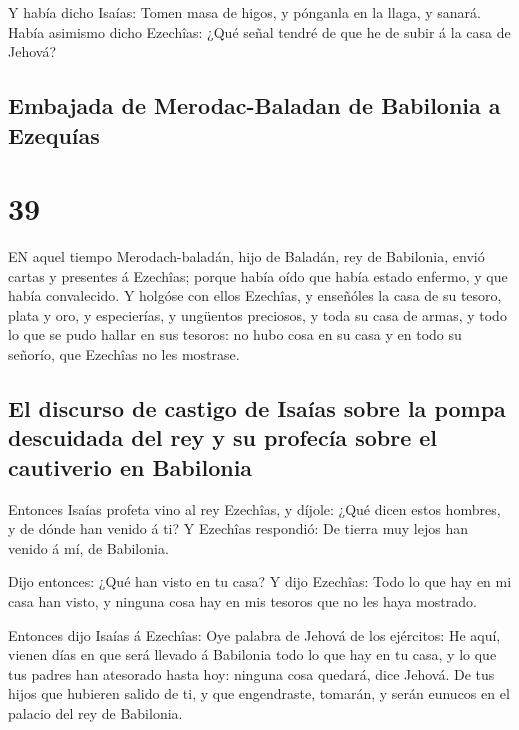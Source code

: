  Y había dicho Isaías: Tomen masa de higos, y pónganla en
la llaga, y sanará.  Había asimismo dicho Ezechîas: ¿Qué
señal tendré de que he de subir á la casa de Jehová?

\hypertarget{embajada-de-merodac-baladan-de-babilonia-a-ezequuxedas}{%
\subsection{Embajada de Merodac-Baladan de Babilonia a
Ezequías}\label{embajada-de-merodac-baladan-de-babilonia-a-ezequuxedas}}

\hypertarget{section-38}{%
\section{39}\label{section-38}}

 EN aquel tiempo Merodach-baladán, hijo de Baladán, rey de
Babilonia, envió cartas y presentes á Ezechîas; porque había oído que
había estado enfermo, y que había convalecido.  Y holgóse
con ellos Ezechîas, y enseñóles la casa de su tesoro, plata y oro, y
especierías, y ungüentos preciosos, y toda su casa de armas, y todo lo
que se pudo hallar en sus tesoros: no hubo cosa en su casa y en todo su
señorío, que Ezechîas no les mostrase.

\hypertarget{el-discurso-de-castigo-de-isauxedas-sobre-la-pompa-descuidada-del-rey-y-su-profecuxeda-sobre-el-cautiverio-en-babilonia}{%
\subsection{El discurso de castigo de Isaías sobre la pompa descuidada
del rey y su profecía sobre el cautiverio en
Babilonia}\label{el-discurso-de-castigo-de-isauxedas-sobre-la-pompa-descuidada-del-rey-y-su-profecuxeda-sobre-el-cautiverio-en-babilonia}}

 Entonces Isaías profeta vino al rey Ezechîas, y díjole:
¿Qué dicen estos hombres, y de dónde han venido á ti? Y Ezechîas
respondió: De tierra muy lejos han venido á mí, de Babilonia.

 Dijo entonces: ¿Qué han visto en tu casa? Y dijo Ezechîas:
Todo lo que hay en mi casa han visto, y ninguna cosa hay en mis tesoros
que no les haya mostrado.

 Entonces dijo Isaías á Ezechîas: Oye palabra de Jehová de
los ejércitos:  He aquí, vienen días en que será llevado á
Babilonia todo lo que hay en tu casa, y lo que tus padres han atesorado
hasta hoy: ninguna cosa quedará, dice Jehová.  De tus hijos
que hubieren salido de ti, y que engendraste, tomarán, y serán eunucos
en el palacio del rey de Babilonia.

